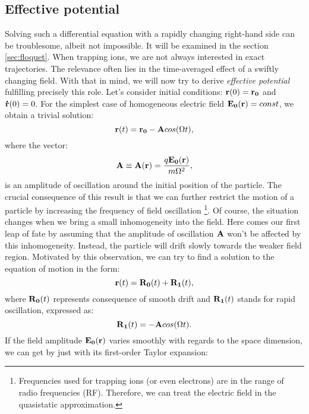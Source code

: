 	\subsection{Effective potential}
Solving such a differential equation with a rapidly changing right-hand side can be troublesome, albeit not impossible. It will be examined in the section \ref{sec:floquet}. When trapping ions, we are not always interested in exact trajectories. The relevance often lies in the time-averaged effect of a swiftly changing field. With that in mind, we will now try to derive \emph{effective potential} fulfilling precisely this role.
Let's consider initial conditions: $\vb{r}(0) = \vb{r_0}$ and $\vb{\dot{r}}(0) = 0$. For the simplest case of homogeneous electric field $\vb{E_0}(\vb{r}) = const$, we obtain a trivial solution:
\begin{equation}
	\label{solution for homogenious field}
	\vb{r}(t) = \vb{r_0} - \vb{A} cos(\Omega t),
\end{equation}
where the vector: 
\begin{equation}
	\label{oscillation amplitude}
	\vb{A} \equiv \vb{A}(\vb{r}) = \frac{q \vb{E_0}(\vb{r})}{m \Omega^2},
\end{equation}
is an amplitude of oscillation around the initial position of the particle. The crucial consequence of this result is that we can further restrict the motion of a particle by increasing the frequency of field oscillation \footnote{Frequencies used for trapping ions (or even electrons) are in the range of radio frequencies (RF). Therefore, we can treat the electric field in the quasistatic approximation.}. Of course, the situation changes when we bring a small inhomogeneity into the field. Here comes our first leap of fate by assuming that the amplitude of oscillation $\vb{A}$ won't be affected by this inhomogeneity. Instead, the particle will drift slowly towards the weaker field region. Motivated by this observation, we can try to find a solution to the equation of motion in the form:
\begin{equation}
	\label{motion separation}
	\vb{r}(t) = \vb{R_0}(t) + \vb{R_1}(t),
\end{equation}
where $\vb{R_0}(t)$ represents consequence of smooth drift and $\vb{R_1}(t)$ stands for rapid oscillation, expressed as:
\begin{equation}
	\label{oscillation motion}
	\vb{R_1}(t) = - \vb{A} cos(\Omega t).
\end{equation}
If the field amplitude $\vb{E_0}(\vb{r})$
 varies smoothly with regards to the space dimension, we can get by just with its first-order Taylor expansion:
